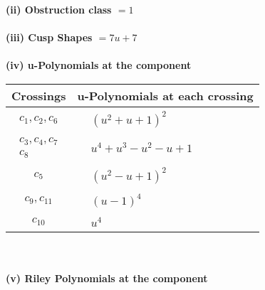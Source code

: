 \documentclass[1p]{elsarticle_modified}
\theoremstyle{definition}
\begin{document}
\flushleft \textbf{(ii) Obstruction class $= 1$}\\~\\
\flushleft \textbf{(iii) Cusp Shapes $= 7 u+7$}\\~\\
\newpage\renewcommand{\arraystretch}{1}
\flushleft \textbf{(iv) u-Polynomials at the component}\newline \\
\begin{tabular}{m{50pt}|m{274pt}}
Crossings & \hspace{64pt}u-Polynomials at each crossing \\
\hline $$\begin{aligned}c_{1},c_{2},c_{6}\end{aligned}$$&$\begin{aligned}
&(u^2+u+1)^2
\end{aligned}$\\
\hline $$\begin{aligned}c_{3},c_{4},c_{7}\\c_{8}\end{aligned}$$&$\begin{aligned}
&u^4+u^3- u^2- u+1
\end{aligned}$\\
\hline $$\begin{aligned}c_{5}\end{aligned}$$&$\begin{aligned}
&(u^2- u+1)^2
\end{aligned}$\\
\hline $$\begin{aligned}c_{9},c_{11}\end{aligned}$$&$\begin{aligned}
&(u-1)^4
\end{aligned}$\\
\hline $$\begin{aligned}c_{10}\end{aligned}$$&$\begin{aligned}
&u^4
\end{aligned}$\\
\hline
\end{tabular}\\~\\
\newpage\renewcommand{\arraystretch}{1}
\flushleft \textbf{(v) Riley Polynomials at the component}\newline \\
\end{document}
